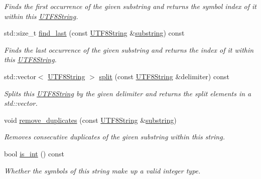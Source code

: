 \begin{DoxyCompactItemize}
\begin{DoxyCompactList}\small\item\em Finds the first occurrence of the given substring and returns the symbol index of it within this \hyperlink{classchaos_1_1uni_1_1_u_t_f8_string}{U\+T\+F8\+String}. \end{DoxyCompactList}\item 
std\+::size\+\_\+t \hyperlink{classchaos_1_1uni_1_1_u_t_f8_string_a482f2501d37379eab6661c45f13b0126}{find\+\_\+last} (const \hyperlink{classchaos_1_1uni_1_1_u_t_f8_string}{U\+T\+F8\+String} \&\hyperlink{classchaos_1_1uni_1_1_u_t_f8_string_a6a92e0b096b7d0087e3c784fa7f891aa}{substring}) const 
\begin{DoxyCompactList}\small\item\em Finds the last occurrence of the given substring and returns the index of it within this \hyperlink{classchaos_1_1uni_1_1_u_t_f8_string}{U\+T\+F8\+String}. \end{DoxyCompactList}\item 
std\+::vector$<$ \hyperlink{classchaos_1_1uni_1_1_u_t_f8_string}{U\+T\+F8\+String} $>$ \hyperlink{classchaos_1_1uni_1_1_u_t_f8_string_afcdc19149409834d2e28f46c597f4a15}{split} (const \hyperlink{classchaos_1_1uni_1_1_u_t_f8_string}{U\+T\+F8\+String} \&delimiter) const 
\begin{DoxyCompactList}\small\item\em Splits this \hyperlink{classchaos_1_1uni_1_1_u_t_f8_string}{U\+T\+F8\+String} by the given delimiter and returns the split elements in a std\+::vector. \end{DoxyCompactList}\item 
void \hyperlink{classchaos_1_1uni_1_1_u_t_f8_string_a940e7ccc70fe1d6c486a5a89941dd2ef}{remove\+\_\+duplicates} (const \hyperlink{classchaos_1_1uni_1_1_u_t_f8_string}{U\+T\+F8\+String} \&\hyperlink{classchaos_1_1uni_1_1_u_t_f8_string_a6a92e0b096b7d0087e3c784fa7f891aa}{substring})
\begin{DoxyCompactList}\small\item\em Removes consecutive duplicates of the given substring within this string. \end{DoxyCompactList}\item 
bool \hyperlink{classchaos_1_1uni_1_1_u_t_f8_string_a758102d22056ad004660c49104526642}{is\+\_\+int} () const 
\begin{DoxyCompactList}\small\item\em Whether the symbols of this string make up a valid integer type. \end{DoxyCompactList}\item 

\end{DoxyCompactItemize}
